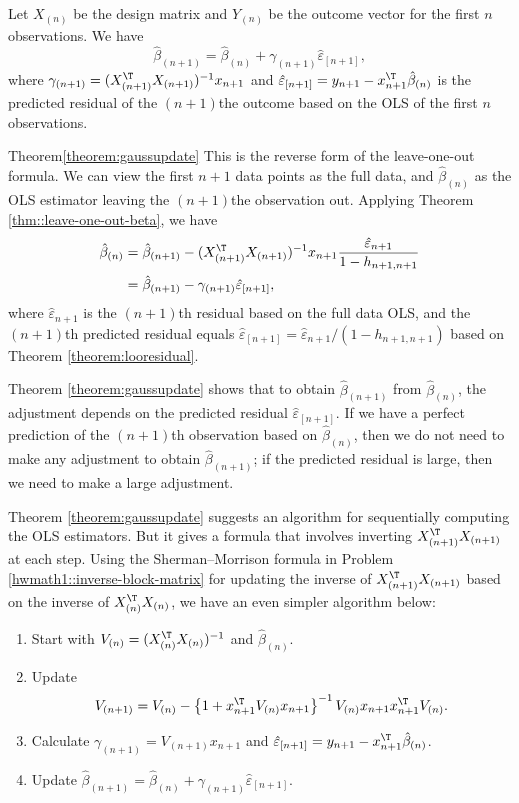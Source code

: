 \begin{theorem}
\label{theorem:gaussupdate}Let $X_{(n)}$ be the design matrix and $Y_{(n)}$
be the outcome vector for the first $n$ observations. We have 
$$
\hat{\beta}_{(n+1)}=\hat{\beta}_{(n)}+\gamma_{(n+1)}\hat{\varepsilon}_{[n+1]},
$$
where $\gamma_{(n+1)}=(X_{(n+1)}^{\T}X_{(n+1)})^{-1}x_{n+1}$ and
$\hat{\varepsilon}_{[n+1]}=y_{n+1}-x_{n+1}^{\T}\hat{\beta}_{(n)}$
is the predicted residual of the $(n+1)$the outcome based on the
OLS of the first $n$ observations. 
\end{theorem}


\begin{myproof}{Theorem}{\ref{theorem:gaussupdate}}
This is the reverse form of the leave-one-out formula. We can view
the first $n+1$ data points as the full data, and $\hat{\beta}_{(n)}$
as the OLS estimator leaving the $(n+1)$the observation out.
Applying Theorem \ref{thm::leave-one-out-beta}, we have 
\begin{align*}
\hat{\beta}_{(n)} & =\hat{\beta}_{(n+1)}-(X_{(n+1)}^{\T}X_{(n+1)})^{-1}x_{n+1}\frac{\hat{\varepsilon}_{n+1}}{1-h_{n+1,n+1}}\\
 & =\hat{\beta}_{(n+1)}-\gamma_{(n+1)}\hat{\varepsilon}_{[n+1]},
\end{align*}
where $\hat{\varepsilon}_{n+1}$ is the $(n+1)$th residual based
on the full data OLS, and the $(n+1)$th predicted residual equals
$\hat{\varepsilon}_{[n+1]}=\hat{\varepsilon}_{n+1}/(1-h_{n+1,n+1})$
based on Theorem \ref{theorem:looresidual}.
\end{myproof}



Theorem \ref{theorem:gaussupdate} shows that to obtain $\hat{\beta}_{(n+1)}$
from $\hat{\beta}_{(n)}$, the adjustment depends on the predicted
residual $\hat{\varepsilon}_{[n+1]}$. If we have a perfect prediction
of the $(n+1)$th observation based on $\hat{\beta}_{(n)}$, then
we do not need to make any adjustment to obtain $\hat{\beta}_{(n+1)}$;
if the predicted residual is large, then we need to make a large
adjustment. 

Theorem \ref{theorem:gaussupdate} suggests an algorithm for sequentially
computing the OLS estimators. But it gives a formula that involves inverting $X_{(n+1)}^{\T}X_{(n+1)}$ at each step.
Using the Sherman--Morrison formula in Problem \ref{hwmath1::inverse-block-matrix}
for updating the inverse of $X_{(n+1)}^{\T}X_{(n+1)}$ based on the
inverse of $X_{(n)}^{\T}X_{(n)}$, we have an even simpler algorithm
below:
\begin{enumerate}
[(G1)]
\item\label{alg::gaussupdate1} Start with $V_{(n)}=(X_{(n)}^{\T}X_{(n)})^{-1}$ and $\hat{\beta}_{(n)}$.
\item Update 
\[
V_{(n+1)}=V_{(n)}-\left\{ 1+x_{n+1}^{\T}V_{(n)}x_{n+1}\right\} ^{-1}V_{(n)}x_{n+1}x_{n+1}^{\T}V_{(n)}.
\]
\item Calculate $\gamma_{(n+1)}=V_{(n+1)}x_{n+1}$ and $\hat{\varepsilon}_{[n+1]}=y_{n+1}-x_{n+1}^{\T}\hat{\beta}_{(n)}$.
\item\label{alg::gaussupdate4} Update $\hat{\beta}_{(n+1)}=\hat{\beta}_{(n)}+\gamma_{(n+1)}\hat{\varepsilon}_{[n+1]}$. 
\end{enumerate}
%



